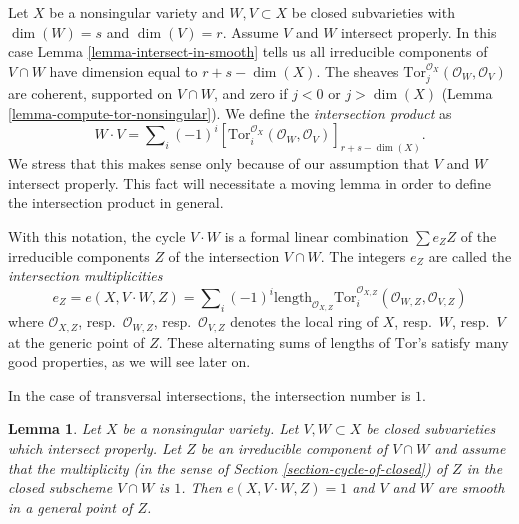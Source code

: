 \documentclass{stacks-project}
\theoremstyle{plain}
\newtheorem{lemma}[subsection]{Lemma}
\theoremstyle{definition}
\theoremstyle{remark}
\numberwithin{equation}{subsection}
\begin{document}
\noindent
Let $X$ be a nonsingular variety and $W, V \subset X$
be closed subvarieties with $\dim(W) = s$ and $\dim(V) = r$.
Assume $V$ and $W$ intersect properly.
In this case Lemma \ref{lemma-intersect-in-smooth} tells us all irreducible
components of $V \cap W$ have dimension equal to $r + s - \dim(X)$.
The sheaves $\text{Tor}_j^{\mathcal{O}_X}(\mathcal{O}_W, \mathcal{O}_V)$ are
coherent, supported on $V \cap W$, and zero if $j < 0$ or $j > \dim(X)$
(Lemma \ref{lemma-compute-tor-nonsingular}).
We define the {\it intersection product} as
$$
W \cdot V = \sum\nolimits_i (-1)^i
[\text{Tor}_i^{\mathcal{O}_X}(\mathcal{O}_W, \mathcal{O}_V)]_{r + s - \dim(X)}.
$$
We stress that this makes sense only because of our assumption that
$V$ and $W$ intersect properly. This fact will necessitate a moving
lemma in order to define the intersection product in general.

\medskip\noindent
With this notation, the cycle $V \cdot W$ is a formal linear
combination $\sum e_Z Z$ of the irreducible components $Z$
of the intersection $V \cap W$. The integers $e_Z$ are called
the {\it intersection multiplicities}
$$
e_Z = e(X, V \cdot W, Z) =
\sum\nolimits_i
(-1)^i
\text{length}_{\mathcal{O}_{X, Z}}
\text{Tor}_i^{\mathcal{O}_{X, Z}}(\mathcal{O}_{W, Z}, \mathcal{O}_{V, Z})
$$
where $\mathcal{O}_{X, Z}$, resp.\ $\mathcal{O}_{W, Z}$,
resp.\ $\mathcal{O}_{V, Z}$ denotes the local ring of $X$, resp.\ $W$,
resp.\ $V$ at the generic point of $Z$.
These alternating sums of lengths of $\text{Tor}$'s satisfy many good
properties, as we will see later on.

\medskip\noindent
In the case of transversal intersections, the intersection number is $1$.

\begin{lemma}
\label{lemma-transversal}
Let $X$ be a nonsingular variety. Let $V, W \subset X$ be
closed subvarieties which intersect properly. Let $Z$ be an irreducible
component of $V \cap W$ and assume that the multiplicity
(in the sense of Section \ref{section-cycle-of-closed}) of $Z$
in the closed subscheme $V \cap W$ is $1$.
Then $e(X, V \cdot W, Z) = 1$ and $V$ and $W$ are smooth
in a general point of $Z$.
\end{lemma}
\end{document}
